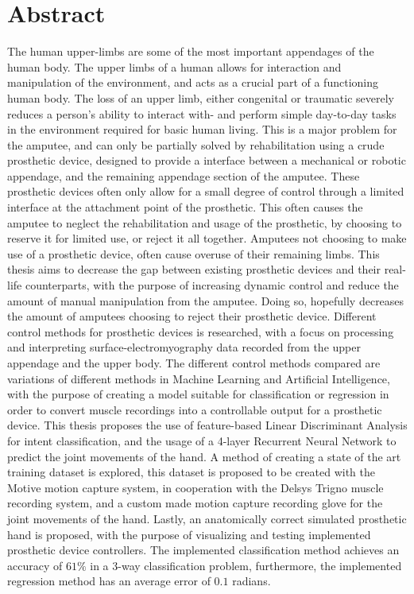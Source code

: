 \documentclass[../main.tex]{subfiles}
\begin{document}
\section*{Abstract}

The human upper-limbs are some of the most important appendages of the human body.
The upper limbs of a human allows for interaction and manipulation of the environment, and acts as a crucial part of a functioning human body.
The loss of an upper limb, either congenital or traumatic severely reduces a person's ability to interact with- and perform simple day-to-day tasks in the environment required for basic human living.
This is a major problem for the amputee, and can only be partially solved by rehabilitation using a crude prosthetic device, designed to provide a interface between a mechanical or robotic appendage, and the remaining appendage section of the amputee.
These prosthetic devices often only allow for a small degree of control through a limited interface at the attachment point of the prosthetic.
This often causes the amputee to neglect the rehabilitation and usage of the prosthetic, by choosing to reserve it for limited use, or reject it all together.
Amputees not choosing to make use of a prosthetic device, often cause overuse of their remaining limbs.
This thesis aims to decrease the gap between existing prosthetic devices and their real-life counterparts, with the purpose of increasing dynamic control and reduce the amount of manual manipulation from the amputee.
Doing so, hopefully decreases the amount of amputees choosing to reject their prosthetic device. 
Different control methods for prosthetic devices is researched, with a focus on processing and interpreting surface-electromyography data recorded from the upper appendage and the upper body.
The different control methods compared are variations of different methods in Machine Learning and Artificial Intelligence, with the purpose of creating a model suitable for classification or regression in order to convert muscle recordings into a controllable output for a prosthetic device.
This thesis proposes the use of feature-based Linear Discriminant Analysis for intent classification, and the usage of a 4-layer Recurrent Neural Network to predict the joint movements of the hand.
A method of creating a state of the art training dataset is explored, this dataset is proposed to be created with the Motive motion capture system, in cooperation with the Delsys Trigno muscle recording system, and a custom made motion capture recording glove for the joint movements of the hand.
Lastly, an anatomically correct simulated prosthetic hand is proposed, with the purpose of visualizing and testing implemented prosthetic device controllers.
The implemented classification method achieves an accuracy of $61\%$ in a 3-way classification problem, furthermore, the implemented regression method has an average error of $0.1$ radians.

\end{document}
